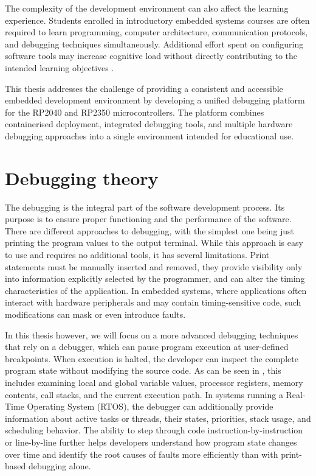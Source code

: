 The complexity of the development environment can also affect the learning experience. Students enrolled in introductory embedded systems courses are often required to learn programming, computer architecture, communication protocols, and debugging techniques simultaneously. Additional effort spent on configuring software tools may increase cognitive load without directly contributing to the intended learning objectives \cite{sweller1988}.

This thesis addresses the challenge of providing a consistent and accessible embedded development environment by developing a unified debugging platform for the RP2040 and RP2350 microcontrollers. The platform combines containerised deployment, integrated debugging tools, and multiple hardware debugging approaches into a single environment intended for educational use.

\section{Debugging theory}

The debugging is the integral part of the software development process. Its purpose is to ensure proper functioning and the performance of the software. There are different approaches to debugging, with the simplest one being just printing the program values to the output terminal. While this approach is easy to use and requires no additional tools, it has several limitations. Print statements must be manually inserted and removed, they provide visibility only into information explicitly selected by the programmer, and can alter the timing characteristics of the application. In embedded systems, where applications often interact with hardware peripherals and may contain timing-sensitive code, such modifications can mask or even introduce faults.

In this thesis however, we will focus on a more advanced debugging techniques that rely on a debugger, which can pause program execution at user-defined breakpoints. When execution is halted, the developer can inspect the complete program state without modifying the source code. As can be seen in , this includes examining local and global variable values, processor registers, memory contents, call stacks, and the current execution path. In systems running a Real-Time Operating System (RTOS), the debugger can additionally provide information about active tasks or threads, their states, priorities, stack usage, and scheduling behavior.  The ability to step through code instruction-by-instruction or line-by-line further helps developers understand how program state changes over time and identify the root causes of faults more efficiently than with print-based debugging alone.

